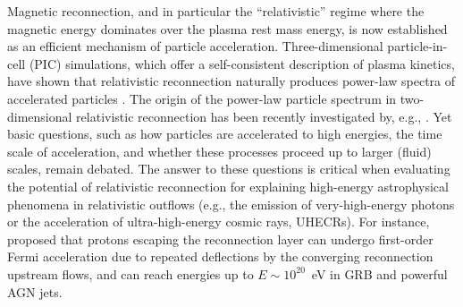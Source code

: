 \documentclass[twocolumn,twocolappendix]{aastex63}
\begin{document}
Magnetic reconnection, and in particular the ``relativistic'' regime where the magnetic energy dominates over the plasma rest mass energy, is now established as an efficient mechanism of particle acceleration. Three-dimensional particle-in-cell (PIC) simulations, which offer a self-consistent description of plasma kinetics, have shown that relativistic reconnection naturally produces power-law spectra of accelerated particles \citep{zenitani_08,kagan_13,guo_14,ss_14,werner_17,guo_20_b}.
The origin of the power-law particle spectrum in two-dimensional relativistic reconnection has been recently investigated by, e.g., \citet{guo_14, uzdensky_20}.
Yet basic questions, such as how particles are accelerated to high energies, the time scale of  acceleration, and whether these processes proceed up to larger (fluid) scales, remain debated. The answer to these questions is critical when evaluating the potential of relativistic reconnection for explaining high-energy astrophysical phenomena  in relativistic outflows ({e.g.,} the emission of very-high-energy photons  or the acceleration of ultra-high-energy cosmic rays, UHECRs). For instance, \citet{giannios_10} proposed that protons escaping the reconnection layer can undergo first-order Fermi acceleration due to repeated deflections by the converging reconnection upstream flows, and can reach energies up to $E\sim10^{20}$~eV in GRB and powerful AGN jets. 

\end{document}
